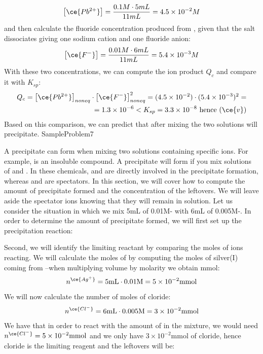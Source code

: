 \documentclass[main.tex]{subfiles}
\begin{document}
\begin{description}
\[ \big[ \ce{Pb^{2+}} \big]=\frac{0.1M\cdot 5mL}{11mL}=4.5\times 10^{-2}M\]
and then calculate the fluoride concentration produced from , given that the salt dissociates giving one sodium cation and one fluoride anion:
\begin{equation*}\big[ \ce{F^{-}} \big]=\frac{0.01M\cdot 6mL}{11mL}=5.4\times 10^{-3}M\end{equation*}
With these two concentrations, we can compute the ion product $Q_c$ and compare it with $K_{sp}$:
\begin{equation*}\begin{split}Q_{c}=\big[ \ce{Pb^{2+}} \big]_{noneq}\cdot \big[ \ce{F^{-}} \big]^2_{noneq}=(4.5\times 10^{-2})\cdot(5.4\times 10^{-3})^2=\\=1.3\times 10^{-6}< K_{sp}=3.3\times10^{-8} \text{ hence } (\ce{v})	\end{split}\end{equation*}
Based on this comparison, we can predict that after mixing the two solutions  will precipitate.
{SampleProblem7}
\item[\docfilehook{Predicting the amount of precipitate formed}{}] 
A precipitate can form when mixing two solutions containing specific ions. For example,  is an insoluble compound. A precipitate will form if you mix solutions of  and . In these chemicals,  and  are directly involved in the precipitate formation, whereas  and  are spectators. In this section, we will cover how to compute the amount of precipitate formed and the concentration of the leftovers. We will leave aside the spectator ions knowing that they will remain in solution.
Let us consider the situation in which we mix 5mL of 0.01M- with 6mL of 0.005M-. In order to determine the amount of precipitate formed, we will first set up the precipitation reaction:
\begin{center}  \end{center}
Second, we will identify the limiting reactant by comparing the moles of ions reacting. We will calculate the moles of  by computing the moles of silver(I) coming from --when multiplying volume by molarity we obtain mmol:
\[n^{\ce{Ag^+}}= 5\text{mL}\cdot 0.01\text{M} =5\times 10^{-2}\text{mmol}	\]
We will now calculate the number of moles of cloride:
\[n^{\ce{Cl^-}}= 6\text{mL}\cdot 0.005\text{M} =3\times 10^{-2}\text{mmol}	\]
We have that in order to react with the amount of  in the mixture, we would need $n^{\ce{Cl^-}}=5\times 10^{-2}\text{mmol}$ and we only have $3\times 10^{-2}\text{mmol}$ of cloride, hence cloride is the limiting reagent and the leftovers will be:

\end{description}
\end{document}
